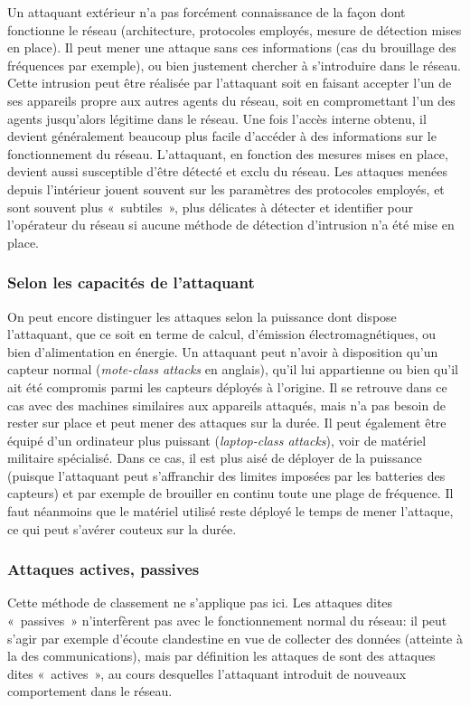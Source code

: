 Un attaquant extérieur n'a pas forcément connaissance de la façon dont fonctionne le réseau (architecture, protocoles employés, mesure de détection mises en place).
Il peut mener une attaque sans ces informations (cas du brouillage des fréquences par exemple), ou bien justement chercher à s'introduire dans le réseau.
Cette intrusion peut être réalisée par l'attaquant soit en faisant accepter l'un de ses appareils propre aux autres agents du réseau, soit en compromettant l'un des agents jusqu'alors légitime dans le réseau.
Une fois l'accès interne obtenu, il devient généralement beaucoup plus facile d'accéder à des informations sur le fonctionnement du réseau.
L'attaquant, en fonction des mesures mises en place, devient aussi susceptible d'être détecté et exclu du réseau.
Les attaques menées depuis l'intérieur jouent souvent sur les paramètres des protocoles employés, et sont souvent plus « subtiles », plus délicates à détecter et identifier pour l'opérateur du réseau si aucune méthode de détection d'intrusion n'a été mise en place.

    \subsubsection{Selon les capacités de l'attaquant}
On peut encore distinguer les attaques selon la puissance dont dispose l'attaquant, que ce soit en terme de calcul, d'émission électromagnétiques, ou bien d'alimentation en énergie.
Un attaquant peut n'avoir à disposition qu'un capteur normal (\textit{mote-class attacks} en anglais), qu'il lui appartienne ou bien qu'il ait été compromis parmi les capteurs déployés à l'origine.
Il se retrouve dans ce cas avec des machines similaires aux appareils attaqués, mais n'a pas besoin de rester sur place et peut mener des attaques sur la durée.
Il peut également être équipé d'un ordinateur plus puissant (\textit{laptop-class attacks}), voir de matériel militaire spécialisé.
Dans ce cas, il est plus aisé de déployer de la puissance (puisque l'attaquant peut s'affranchir des limites imposées par les batteries des capteurs) et par exemple de brouiller en continu toute une plage de fréquence.
Il faut néanmoins que le matériel utilisé reste déployé le temps de mener l'attaque, ce qui peut s'avérer couteux sur la durée.

    \subsubsection{Attaques actives, passives}
Cette méthode de classement ne s'applique pas ici.
Les attaques dites « passives » n'interfèrent pas avec le fonctionnement normal du réseau: il peut s'agir par exemple d'écoute clandestine en vue de collecter des données (atteinte à la  des communications), mais par définition les attaques de \dds sont des attaques dites « actives », au cours desquelles l'attaquant introduit de nouveaux comportement dans le réseau.

